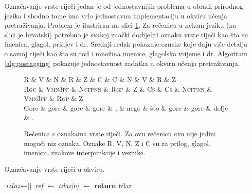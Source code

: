 Označavanje vrste riječi jedan je od jednostavnijih problema u obradi prirodnog
jezika i shodno tome ima vrlo jednostavnu implementaciju u okviru učenja
pretraživanja. Problem je ilustriran na slici \ref{fig:postagging}. Za rečenicu
u nekom jeziku (na slici je hrvatski) potrebno je svakoj znački dodijeliti
oznaku vrste riječi kao što su imenica, glagol, pridjev i dr. Srednji redak
pokazuje oznake koje daju više detalja o samoj riječi kao što su rod i množina
imenice, glagolsko vrijeme i dr. Algoritam \ref{alg:postagging} pokazuje
jednostavnost zadatka u okviru učenja pretraživanja.

\begin{figure}
\centering
\begin{dependency}
\begin{deptext}
  \textsc{R}   \& \textsc{V}      \& \textsc{N}      \& \textsc{R}   \& \textsc{Z} \& \textsc{C}  \& \textsc{C}  \& \textsc{N}      \& \textsc{V}      \& \textsc{R}   \& \textsc{Z} \\
  \textsc{Rgc} \& \textsc{Vmn3pf} \& \textsc{Ncfpnn} \& \textsc{Rgp} \& \textsc{Z} \& \textsc{Cs} \& \textsc{Cs} \& \textsc{Ncfpnn} \& \textsc{Vmn3pf} \& \textsc{Rgp} \& \textsc{Z} \\
  Gore         \& gore            \& gore            \& gore         \& ,          \& nego        \& što         \& gore            \& gore            \& dolje        \& .          \\
\end{deptext}
\end{dependency}
\caption[Rečenica s oznakama vrste riječi.]{Rečenica s oznakama vrste riječi. Za
ovu rečenicu ovo nije jedini mogući niz oznaka. Oznake R, V, N, Z i C su za
prilog, glagol, imenicu, znakove interpunkcije i veznike.}
\label{fig:postagging}
\end{figure}

\begin{algorithm}
\caption{Označavanje vrste riječi u \lts{} okviru.}\label{alg:postagging}
\begin{algorithmic}[1]
\State $\textit{izlaz} \gets \text{[]}$
  \State \textit{ref} $\gets$ 
  \State \textit{izlaz[n]} $\gets$ 
\EndFor
\State {}
\State \textbf{return} izlaz
\EndFunction
\end{algorithmic}
\end{algorithm}

